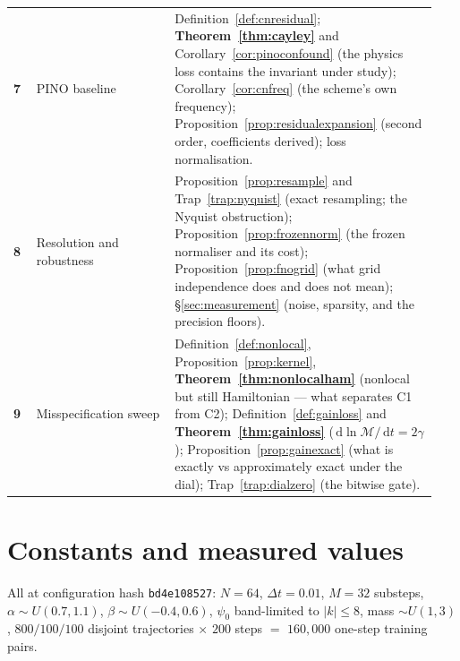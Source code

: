 \documentclass[11pt,a4paper]{article}
\theoremstyle{plain}
\theoremstyle{definition}
\theoremstyle{remark}
\newcommand{\dd}{\,\mathrm{d}}
\newcommand{\dt}{\Delta t}
\newcommand{\Mass}{\mathcal{M}}
\newcommand{\code}[1]{\texttt{\small #1}}
\begin{document}
\begin{center}
\begin{longtable}{@{}p{0.055\linewidth}p{0.30\linewidth}p{0.58\linewidth}@{}}
\textbf{7} & PINO baseline & Definition~\ref{def:cnresidual};
\textbf{Theorem~\ref{thm:cayley}} and Corollary~\ref{cor:pinoconfound} (the physics loss
contains the invariant under study); Corollary~\ref{cor:cnfreq} (the scheme's own
frequency); Proposition~\ref{prop:residualexpansion} (second order, coefficients derived);
loss normalisation.\\[0.4em]

\textbf{8} & Resolution and robustness & Proposition~\ref{prop:resample} and
Trap~\ref{trap:nyquist} (exact resampling; the Nyquist obstruction);
Proposition~\ref{prop:frozennorm} (the frozen normaliser and its cost);
Proposition~\ref{prop:fnogrid} (what grid independence does and does not mean);
\S\ref{sec:measurement} (noise, sparsity, and the precision floors).\\[0.4em]

\textbf{9} & Misspecification sweep & Definition~\ref{def:nonlocal},
Proposition~\ref{prop:kernel}, \textbf{Theorem~\ref{thm:nonlocalham}} (nonlocal but still
Hamiltonian --- what separates C1 from C2); Definition~\ref{def:gainloss} and
\textbf{Theorem~\ref{thm:gainloss}} ($\dd\ln\Mass/\dd t = 2\gamma$);
Proposition~\ref{prop:gainexact} (what is exactly vs approximately exact under the dial);
Trap~\ref{trap:dialzero} (the bitwise gate).\\
\bottomrule
\end{longtable}
\end{center}

\section{Constants and measured values}
\label{sec:constants}

All at configuration hash \code{bd4e108527}: $N=64$, $\dt=0.01$, $M=32$ substeps,
$\alpha\sim U(0.7,1.1)$, $\beta\sim U(-0.4,0.6)$, $\psi_0$ band-limited to $|k|\le8$,
mass $\sim U(1,3)$, $800/100/100$ disjoint trajectories $\times$ $200$ steps
$=$ $160{,}000$ one-step training pairs.
\end{document}
